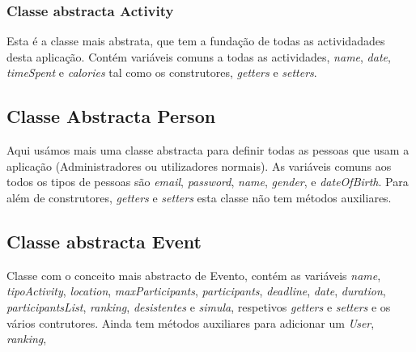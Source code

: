 \documentclass[10pt,notitlepage]{article}
\begin{document}
\subsubsection{Classe abstracta Activity}

Esta é a classe mais abstrata, que tem a fundação de todas as actividadades desta aplicação. Contém variáveis comuns a todas as actividades, \textit{name}, \textit{date}, \textit{timeSpent} e \textit{calories} tal como os construtores, \textit{getters} e  \textit{setters}.




\subsection{Classe Abstracta Person}

Aqui usámos mais uma classe abstracta para definir todas as pessoas que usam a aplicação (Administradores ou utilizadores normais). As variáveis comuns aos todos os tipos de pessoas são \textit{email}, \textit{password}, \textit{name}, \textit{gender}, e \textit{dateOfBirth}. Para além de 
construtores, \textit{getters} e \textit{setters} esta classe não tem métodos auxiliares.





\subsection{Classe abstracta Event}

Classe com o conceito mais abstracto de Evento, contém as variáveis \textit{name}, \textit{tipoActivity}, \textit{location}, \textit{maxParticipants}, \textit{participants}, \textit{deadline}, \textit{date}, \textit{duration}, \textit{participantsList}, \textit{ranking}, \textit{desistentes} e \textit{simula}, respetivos \textit{getters} e \textit{setters} e os vários contrutores. Ainda tem métodos auxiliares para adicionar um \textit{User}, \textit{ranking}, 


\subsection{}
\end{document}
